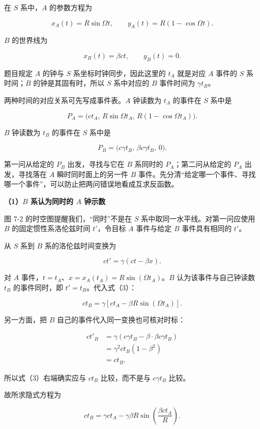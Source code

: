 \documentclass[12pt,a4paper,UTF8]{ctexart}
\begin{document}
在 \(S\) 系中，\(A\) 的参数方程为

\[\boxed{
x_A(t)=R\sin\Omega t,\qquad
y_A(t)=R(1-\cos\Omega t)
}. \tag{1}\]

\(B\) 的世界线为

\[x_B(t)=\beta ct,\qquad y_B(t)=0. \tag{2}\]

题目规定 \(A\) 的钟与 \(S\) 系坐标时钟同步，因此这里的 \(t_A\) 就是对应
\(A\) 事件的 \(S\) 系时间；\(B\) 的钟是其固有时，所以 \(S\) 系中对应的
\(B\) 事件时间为 \(\gamma t_B\)。

两种时间的对应关系可先写成事件表。\(A\) 钟读数为 \(t_A\) 的事件在 \(S\)
系中是

\[P_A=\bigl(ct_A,\,R\sin\Omega t_A,\,R(1-\cos\Omega t_A)\bigr).\]

\(B\) 钟读数为 \(t_B\) 的事件在 \(S\) 系中是

\[P_B=\bigl(c\gamma t_B,\,\beta c\gamma t_B,\,0\bigr).\]

第一问从给定的 \(P_B\) 出发，寻找与它在 \(B\) 系同时的
\(P_A\)；第二问从给定的 \(P_A\) 出发，寻找落在 \(A\)
瞬时同时面上的另一件 \(B\)
事件。先分清``给定哪一个事件、寻找哪一个事件''，可以防止把两问错误地看成互求反函数。

\textbf{（1）\(B\) 系认为同时的 \(A\) 钟示数}

图 7-2 的时空图提醒我们，``同时''不是在 \(S\)
系中取同一水平线。对第一问应使用 \(B\) 的固定惯性系洛伦兹时间
\(t'\)，令目标 \(A\) 事件与给定 \(B\) 事件具有相同的 \(t'\)。

从 \(S\) 系到 \(B\) 系的洛伦兹时间变换为

\[ct'=\gamma(ct-\beta x). \tag{3}\]

对 \(A\) 事件，\(t=t_A\)、\(x=x_A(t_A)=R\sin(\Omega t_A)\)。\(B\)
认为该事件与自己钟读数 \(t_B\) 的事件同时，即 \(t'=t_B\)。代入式（3）：

\[ct_B=\gamma\left[ct_A-\beta R\sin(\Omega t_A)\right].\]

另一方面，把 \(B\) 自己的事件代入同一变换也可核对时标：

\[\begin{aligned}
ct'_B
&=\gamma\left(c\gamma t_B-\beta\cdot\beta c\gamma t_B\right)\\
&=\gamma^2ct_B(1-\beta^2)\\
&=ct_B.
\end{aligned}\]

所以式（3）右端确实应与 \(ct_B\) 比较，而不是与 \(c\gamma t_B\) 比较。

故所求隐式方程为

\[\boxed{
ct_B=\gamma ct_A-\gamma\beta R
\sin\left(\frac{\beta ct_A}{R}\right)
}. \tag{4}\]
\end{document}
